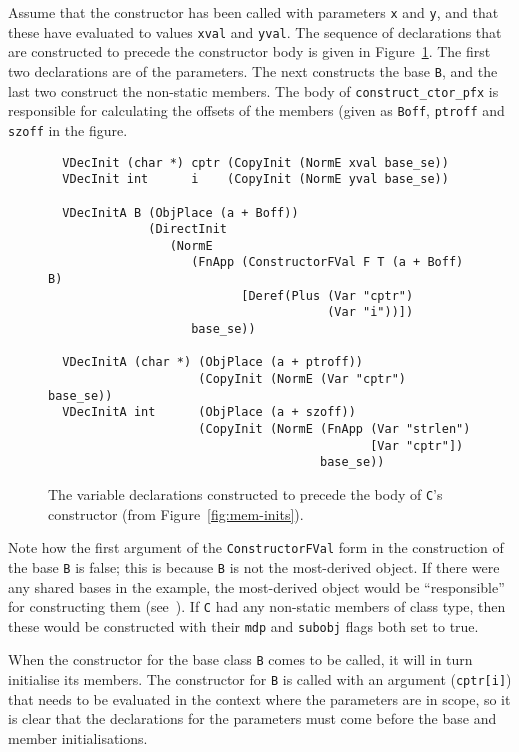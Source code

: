 \documentclass[11pt]{article}
\begin{document}
Assume that the constructor has been called with parameters \texttt{x}
and \texttt{y}, and that these have evaluated to values \texttt{xval}
and \texttt{yval}. The sequence of declarations that are constructed
to precede the constructor body is given in
Figure~\ref{fig:constructor-vdecs}. The first two declarations are of
the parameters.  The next constructs the base \texttt{B}, and the last
two construct the non-static members.  The body of
\texttt{construct_ctor_pfx} is responsible for calculating the offsets
of the members (given as \texttt{Boff}, \texttt{ptroff} and
\texttt{szoff} in the figure.

\begin{figure}[hbtp]
\begin{verbatim}
  VDecInit (char *) cptr (CopyInit (NormE xval base_se))
  VDecInit int      i    (CopyInit (NormE yval base_se))

  VDecInitA B (ObjPlace (a + Boff))
              (DirectInit
                 (NormE
                    (FnApp (ConstructorFVal F T (a + Boff) B)
                           [Deref(Plus (Var "cptr")
                                       (Var "i"))])
                    base_se))

  VDecInitA (char *) (ObjPlace (a + ptroff))
                     (CopyInit (NormE (Var "cptr") base_se))
  VDecInitA int      (ObjPlace (a + szoff))
                     (CopyInit (NormE (FnApp (Var "strlen")
                                             [Var "cptr"])
                                      base_se))
\end{verbatim}
  \caption[Variable Declarations Generated from
  Figure~\ref{fig:mem-inits}]{The variable declarations constructed to
    precede the body of \texttt{C}'s constructor (from
    Figure~\ref{fig:mem-inits}).}
\label{fig:constructor-vdecs}
\end{figure}

Note how the first argument of the \texttt{ConstructorFVal} form in
the construction of the base \texttt{B} is false; this is because
\texttt{B} is not the most-derived object.  If there were any shared
bases in the example, the most-derived object would be ``responsible''
for constructing them (see~\cite[\S12.6.2, paragraph
5]{cpp-standard-iso14882}).  If \texttt{C} had any non-static members
of class type, then these would be constructed with their
\texttt{mdp} and \texttt{subobj} flags both set to true.

When the constructor for the base class \texttt{B} comes to be called,
it will in turn initialise its members.  The constructor for
\texttt{B} is called with an argument (\texttt{cptr[i]}) that needs to
be evaluated in the context where the parameters are in scope, so it
is clear that the declarations for the parameters must come before the
base and member initialisations.
\end{document}
